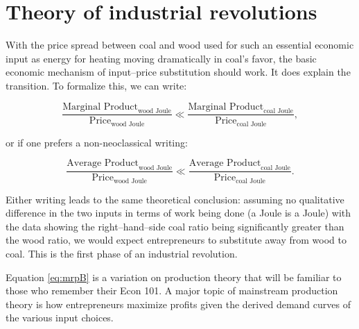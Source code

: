 	\section{Theory of industrial revolutions}	
	With the price spread between coal and wood used for such an essential economic input as energy for heating moving dramatically in coal's favor, the basic economic mechanism of input--price substitution should work. It does explain the transition. To formalize this, we can write:

\linespread{1.2}
		\begin{equation}
		\label{eq:mrp1}
		\frac{\text{Marginal Product}_{\text{wood Joule}}}{\text{Price}_{\text{wood Joule}}} \ll \frac{\text{Marginal Product}_{\text{coal Joule}}}{\text{Price}_{\text{coal Joule}}},
		\end{equation}

\vspace*{21.5pt}
or if one prefers a non-neoclassical writing:

		\begin{equation}
		\label{eq:mrpA}
		\frac{\text{Average Product}_{\text{wood Joule}}}{\text{Price}_{\text{wood Joule}}} \ll \frac{\text{Average Product}_{\text{coal Joule}}}{\text{Price}_{\text{coal Joule}}}.
		\end{equation}
\linespread{1.9}

Either writing leads to the same theoretical conclusion: assuming no qualitative difference in the two inputs in terms of work being done (a Joule is a Joule) with the data showing the right--hand--side coal ratio being significantly greater than the wood ratio, we would expect entrepreneurs to substitute away from wood to coal. This is the first phase of an industrial revolution.

Equation \ref{eq:mrpB} is a variation on production theory that will be familiar to those who remember their Econ 101. A major topic of mainstream production theory is how entrepreneurs maximize profits given the derived demand curves of the various input choices. 


